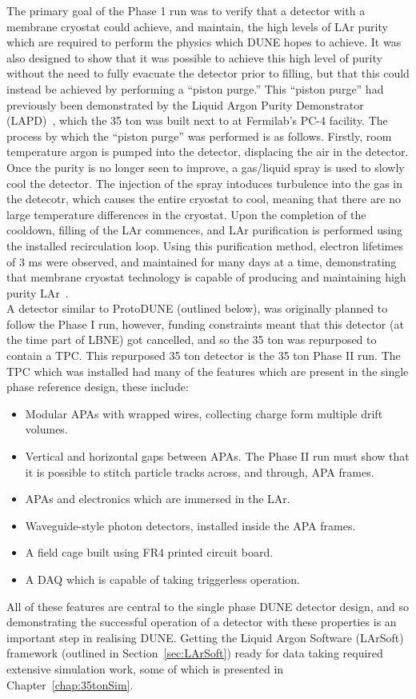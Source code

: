 The primary goal of the Phase 1 run was to verify that a detector with a membrane cryostat could achieve, and maintain, the high levels of LAr purity which are required to perform the physics which DUNE hopes to achieve. It was also designed to show that it was possible to achieve this high level of purity without the need to fully evacuate the detector prior to filling, but that this could instead be achieved by performing a ``piston purge.'' This ``piston purge'' had previously been demonstrated by the Liquid Argon Purity Demonstrator (LAPD)~\citep{LAPD}, which the 35 ton was built next to at Fermilab's PC-4 facility. The process by which the ``piston purge'' was performed is as follows. Firstly, room temperature argon is pumped into the detector, displacing the air in the detector. Once the purity is no longer seen to improve, a gas/liquid spray is used to slowly cool the detector. The injection of the spray intoduces turbulence into the gas in the detecotr, which causes the entire cryostat to cool, meaning that there are no large temperature differences in the cryostat. Upon the completion of the cooldown, filling of the LAr commences, and LAr purification is performed using the installed recirculation loop. Using this purification method, electron lifetimes of 3 ms were observed, and maintained for many days at a time, demonstrating that membrane cryostat technology is capable of producing and maintaining high purity LAr~\citep{35tonMontanari, 35tonHahn}. \\

A detector similar to ProtoDUNE (outlined below), was originally planned to follow the Phase I run, however, funding constraints meant that this detector (at the time part of LBNE) got cancelled, and so the 35 ton was repurposed to contain a TPC. This repurposed 35 ton detector is the 35 ton Phase II run. The TPC which was installed had many of the features which are present in the single phase reference design, these include:
\begin{itemize}
\item Modular APAs with wrapped wires, collecting charge form multiple drift volumes.
\item Vertical and horizontal gaps between APAs. The Phase II run must show that it is possible to stitch particle tracks across, and through, APA frames.
\item APAs and electronics which are immersed in the LAr.
\item Waveguide-style photon detectors, installed inside the APA frames.
\item A field cage built using FR4 printed circuit board.
\item A DAQ which is capable of taking triggerless operation.
\end{itemize}
All of these features are central to the single phase DUNE detector design, and so demonstrating the successful operation of a detector with these properties is an important step in realising DUNE. Getting the Liquid Argon Software (LArSoft) framework (outlined in Section~\ref{sec:LArSoft}) ready for data taking required extensive simulation work, some of which is presented in Chapter~\ref{chap:35tonSim}. \\

